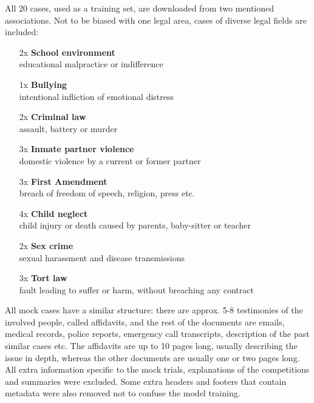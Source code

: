 \documentclass[
  digital, %
  notable,   %
  nolof,     %
  nolot,     %
]{fithesis3}
\begin{document}
All 20 cases, used as a training set, are downloaded from two mentioned associations.
Not to be biased with one legal area, cases of diverse legal fields are included:
\begin{itemize}
\itemsep0em
\item[2x] \textbf{School environment} \\ educational malpractice or indifference
\item[1x] \textbf{Bullying} \\ intentional infliction of emotional distress
\item[2x] \textbf{Criminal law} \\ assault, battery or murder
\item[3x] \textbf{Inmate partner violence} \\ domestic violence by a current or former partner
\item[3x] \textbf{First Amendment} \\ breach of freedom of speech, religion, press etc.
\item[4x] \textbf{Child neglect} \\ child injury or death caused by parents, baby-sitter or teacher
\item[2x] \textbf{Sex crime} \\ sexual harassment and disease transmissions
\item[3x] \textbf{Tort law } \\ fault leading to suffer or harm, without breaching any contract
\end{itemize}
All mock cases have a similar structure: there are approx. 5-8 testimonies of the involved people, called affidavits, and the rest of the documents are emails, medical records, police reports, emergency call transcripts, description of the past similar cases etc.
The affidavits are up to 10 pages long, usually describing the issue in depth, whereas the other documents are usually one or two pages long.
All extra information specific to the mock trials, explanations of the competitions and summaries were excluded.
Some extra headers and footers that contain metadata were also removed not to confuse the model training.
\end{document}
